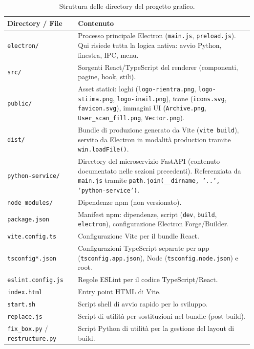 \documentclass[a4paper,12pt]{article}
\begin{document}
\begin{table}[H]
\centering
\caption{Struttura delle directory del progetto grafico.}
\begin{tabular}{L{4cm} L{8.5cm}}
\toprule
\textbf{Directory / File} & \textbf{Contenuto} \\
\midrule
\texttt{electron/} &
  Processo principale Electron (\texttt{main.js},
  \texttt{preload.js}). Qui risiede tutta la logica nativa:
  avvio Python, finestra, IPC, menu. \\[3pt]
\texttt{src/} &
  Sorgenti React/TypeScript del renderer (componenti, pagine,
  hook, stili). \\[3pt]
\texttt{public/} &
  Asset statici: loghi (\texttt{logo-rientra.png},
  \texttt{logo-stiima.png}, \texttt{logo-inail.png}),
  icone (\texttt{icons.svg}, \texttt{favicon.svg}),
  immagini UI (\texttt{Archive.png}, \texttt{User\_scan\_fill.png},
  \texttt{Vector.png}). \\[3pt]
\texttt{dist/} &
  Bundle di produzione generato da Vite (\texttt{vite build}),
  servito da Electron in modalit\`{a} production tramite
  \texttt{win.loadFile()}. \\[3pt]
\texttt{python-service/} &
  Directory del microservizio FastAPI (contenuto documentato
  nelle sezioni precedenti). Referenziata da \texttt{main.js}
  tramite \texttt{path.join(\_\allowbreak{}\_\allowbreak{}dirname, '..', 'python-service')}. \\[3pt]
\texttt{node\_modules/} &
  Dipendenze npm (non versionato). \\[3pt]
\texttt{package.json} &
  Manifest npm: dipendenze, script (\texttt{dev}, \texttt{build},
  \texttt{electron}), configurazione Electron Forge/Builder. \\[3pt]
\texttt{vite.config.ts} &
  Configurazione Vite per il bundle React. \\[3pt]
\texttt{tsconfig*.json} &
  Configurazioni TypeScript separate per app (\texttt{tsconfig.app.json}),
  Node (\texttt{tsconfig.node.json}) e root. \\[3pt]
\texttt{eslint.config.js} &
  Regole ESLint per il codice TypeScript/React. \\[3pt]
\texttt{index.html} &
  Entry point HTML di Vite. \\[3pt]
\texttt{start.sh} &
  Script shell di avvio rapido per lo sviluppo. \\[3pt]
\texttt{replace.js} &
  Script di utilit\`{a} per sostituzioni nel bundle (post-build). \\[3pt]
\texttt{fix\_box.py} / \texttt{restructure.py} &
  Script Python di utilit\`{a} per la gestione del layout di build. \\
\bottomrule
\end{tabular}
\end{table}
\end{document}
